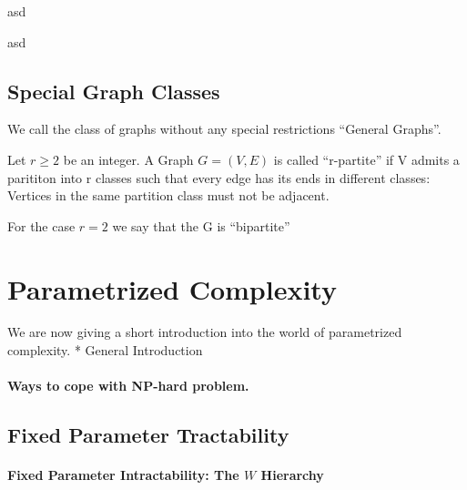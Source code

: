 \begin{definition}
    asd
\end{definition}

\begin{definition}
    asd
\end{definition}

\subsection*{Special Graph Classes}
We call the class of graphs without any special restrictions ``General Graphs''.

\begin{definition}
    Let $r \geq 2$ be an integer. A Graph $G = (V,E)$ is called ``r-partite'' if V admits a parititon into r classes such that every edge has its ends in different classes: Vertices in the same partition class must not be adjacent. 
    
    For the case $r = 2$ we say that the G is ``bipartite'' 
    
\end{definition}

\begin{definition}
    
\end{definition}

\begin{definition}
    
\end{definition}


\section{Parametrized Complexity}
We are now giving a short introduction into the world of parametrized complexity. 
* General Introduction
\paragraph{Ways to cope with NP-hard problem.}

\subsection{Fixed Parameter Tractability}
\paragraph{Fixed Parameter Intractability: The \hmath $W$ Hierarchy}

